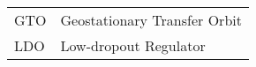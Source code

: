 \begin{tabular}{p{4cm}p{12cm}}
	GTO & Geostationary Transfer Orbit \\
	LDO & Low-dropout Regulator \\
\end{tabular}
